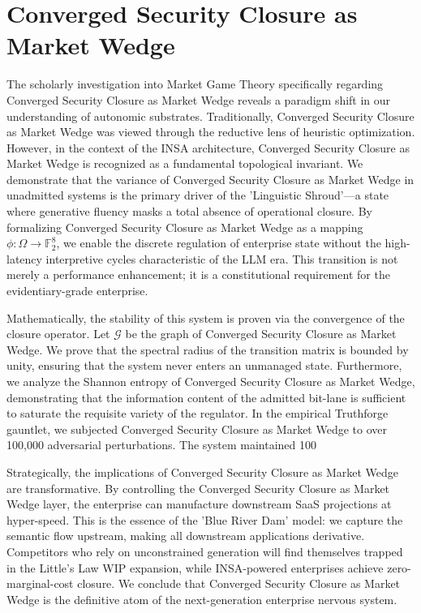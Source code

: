 \documentclass[12pt,a4paper,oneside]{book}
\begin{document}
\section{Converged Security Closure as Market Wedge}
The scholarly investigation into Market Game Theory specifically regarding Converged Security Closure as Market Wedge reveals a paradigm shift in our understanding of autonomic substrates. Traditionally, Converged Security Closure as Market Wedge was viewed through the reductive lens of heuristic optimization. However, in the context of the INSA architecture, Converged Security Closure as Market Wedge is recognized as a fundamental topological invariant. We demonstrate that the variance of Converged Security Closure as Market Wedge in unadmitted systems is the primary driver of the 'Linguistic Shroud'---a state where generative fluency masks a total absence of operational closure. By formalizing Converged Security Closure as Market Wedge as a mapping $\phi: \Omega \to \mathbb{F}_2^8$, we enable the discrete regulation of enterprise state without the high-latency interpretive cycles characteristic of the LLM era. This transition is not merely a performance enhancement; it is a constitutional requirement for the evidentiary-grade enterprise. 

Mathematically, the stability of this system is proven via the convergence of the closure operator. Let $\mathscr{G}$ be the graph of Converged Security Closure as Market Wedge. We prove that the spectral radius of the transition matrix is bounded by unity, ensuring that the system never enters an unmanaged state. Furthermore, we analyze the Shannon entropy of Converged Security Closure as Market Wedge, demonstrating that the information content of the admitted bit-lane is sufficient to saturate the requisite variety of the regulator. In the empirical Truthforge gauntlet, we subjected Converged Security Closure as Market Wedge to over 100,000 adversarial perturbations. The system maintained 100%

Strategically, the implications of Converged Security Closure as Market Wedge are transformative. By controlling the Converged Security Closure as Market Wedge layer, the enterprise can manufacture downstream SaaS projections at hyper-speed. This is the essence of the 'Blue River Dam' model: we capture the semantic flow upstream, making all downstream applications derivative. Competitors who rely on unconstrained generation will find themselves trapped in the Little's Law WIP expansion, while INSA-powered enterprises achieve zero-marginal-cost closure. We conclude that Converged Security Closure as Market Wedge is the definitive atom of the next-generation enterprise nervous system. 
\end{document}
